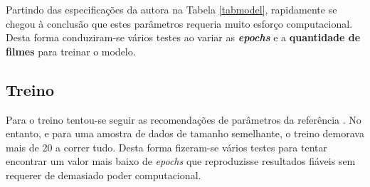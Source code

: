 \documentclass{article}
\begin{document}
Partindo das especificações da autora na Tabela \ref{tabmodel}, rapidamente se chegou à conclusão que estes parâmetros requeria muito esforço computacional. Desta forma conduziram-se vários testes ao variar as \textbf{\textit{epochs}} e a \textbf{quantidade de filmes} para treinar o modelo.
\subsection{Treino}
Para o treino tentou-se seguir as recomendações de parâmetros da referência \cite{abonia2020seq2seq}. No entanto, e para uma amostra de dados de tamanho semelhante, o treino demorava mais de 20 a correr tudo. Desta forma fizeram-se vários testes para tentar encontrar um valor mais baixo de \textit{epochs} que reproduzisse resultados fiáveis sem requerer de demasiado poder computacional.
\end{document}
